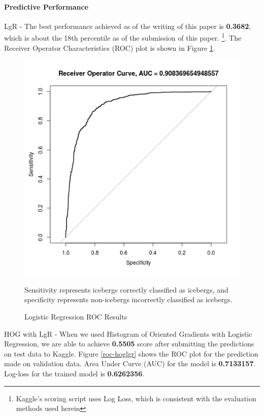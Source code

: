 \documentclass[fleqn,10pt]{SelfArx} %
\begin{document}
\paragraph{Predictive Performance}
LgR - The best performance achieved as of the writing of this paper is \textbf{0.3682}, which is about the 18th percentile as of the submission of this paper. \footnote{Kaggle's scoring script uses Log Loss, which is consistent with the evaluation methods used herein}.  The Receiver Operator Characteristics (ROC) plot is shown in Figure \ref{roc-lgr}.\\

\begin{figure}
	\centering
	\includegraphics[width=0.9\linewidth]{iceberg/ROC_Results.png}
	\caption{Logistic Regression ROC Results}\label{roc-lgr}
	\small
	Sensitivity represents icebergs correctly classified as icebergs, and specificity represents non-icebergs incorrectly classified as icebergs.
\end{figure}

HOG with LgR - When we used Histogram of Oriented Gradients with Logistic Regression, we are able to achieve \textbf{0.5505} score after submitting the predictions on test data to Kaggle. Figure \ref{roc-hoglgr} shows the ROC plot for the prediction made on validation data. Area Under Curve (AUC) for the model is \textbf{0.7133157}. Log-loss for the trained model is \textbf{0.6262356}.\\ 	 
\end{document}
